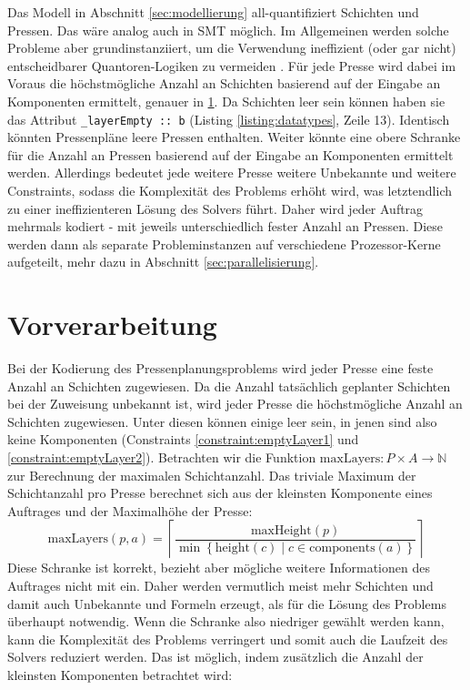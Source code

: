 Das Modell in Abschnitt \ref{sec:modellierung} all-quantifiziert Schichten und Pressen.
Das wäre analog auch in SMT möglich.
Im Allgemeinen werden solche Probleme aber grundinstanziiert,
um die Verwendung ineffizient (oder gar nicht) entscheidbarer Quantoren-Logiken zu vermeiden \cite{smtquantifiersarehard, smtquantifiersarehard2}.
Für jede Presse wird dabei im Voraus die höchstmögliche Anzahl an Schichten basierend auf der Eingabe an Komponenten ermittelt, genauer in \ref{sec:vorverarbeitung}.
Da Schichten leer sein können haben sie das Attribut \texttt{\_layerEmpty :: b} (Listing \ref{listing:datatypes}, Zeile 13).
Identisch könnten Pressenpläne leere Pressen enthalten.
Weiter könnte eine obere Schranke für die Anzahl an Pressen basierend auf der Eingabe an Komponenten ermittelt werden.
Allerdings bedeutet jede weitere Presse weitere Unbekannte und weitere Constraints, sodass die Komplexität des Problems erhöht wird,
was letztendlich zu einer ineffizienteren Lösung des Solvers führt.
Daher wird jeder Auftrag mehrmals kodiert - mit jeweils unterschiedlich fester Anzahl an Pressen.
Diese werden dann als separate Probleminstanzen auf verschiedene Prozessor-Kerne aufgeteilt, mehr dazu in Abschnitt \ref{sec:parallelisierung}.

\section{Vorverarbeitung}
\label{sec:vorverarbeitung}
Bei der Kodierung des Pressenplanungsproblems wird jeder Presse eine feste Anzahl an Schichten zugewiesen.
Da die Anzahl tatsächlich geplanter Schichten bei der Zuweisung unbekannt ist, wird jeder Presse die höchstmögliche Anzahl an Schichten zugewiesen.
Unter diesen können einige leer sein, in jenen sind also keine Komponenten (Constraints \ref{constraint:emptyLayer1} und \ref{constraint:emptyLayer2}).
Betrachten wir die Funktion $\text{maxLayers}: P \times A \rightarrow \mathbb{N}$ zur Berechnung der maximalen Schichtanzahl.
Das triviale Maximum der Schichtanzahl pro Presse berechnet sich aus der kleinsten Komponente eines Auftrages und der Maximalhöhe der Presse:
\[
    \text{maxLayers}(p,a) = \left\lceil \frac{\text{maxHeight}(p)}{\min \left\{ \text{height}(c) \mid c \in \text{components}(a) \right\}} \right\rceil
\]
Diese Schranke ist korrekt, bezieht aber mögliche weitere Informationen des Auftrages nicht mit ein.
Daher werden vermutlich meist mehr Schichten und damit auch Unbekannte und Formeln erzeugt, als für die Lösung des Problems überhaupt notwendig.
Wenn die Schranke also niedriger gewählt werden kann, kann die Komplexität des Problems verringert und somit auch die Laufzeit des Solvers reduziert werden.
Das ist möglich, indem zusätzlich die Anzahl der kleinsten Komponenten betrachtet wird:

